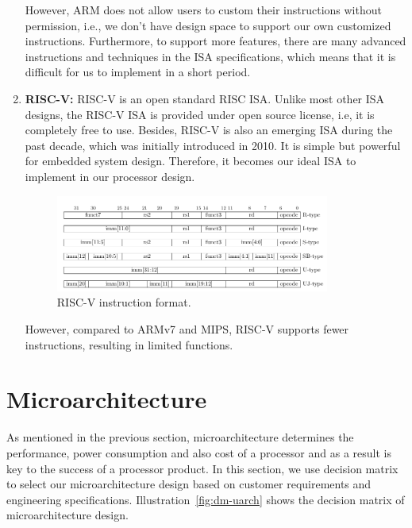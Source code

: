 \begin{enumerate}
However, ARM does not allow users to custom their instructions without permission, i.e., we don't have design space to support our own customized instructions. Furthermore, to support more features, there are many advanced instructions and techniques in the ISA specifications, which means that it is difficult for us to implement in a short period.

\item \textbf{RISC-V:} RISC-V is an open standard RISC ISA. Unlike most other ISA designs, the RISC-V ISA is provided under open source license, i.e, it is completely free to use. Besides, RISC-V is also an emerging ISA during the past decade, which was initially introduced in 2010. It is simple but powerful for embedded system design. Therefore, it becomes our ideal ISA to implement in our processor design.

\begin{figure}[!htp]
    \centering
    \includegraphics[width=0.85\textwidth]{figure/riscv-isa.png}
    \caption{RISC-V instruction format.}
    \label{fig:RISCV_inst}
\end{figure}

However, compared to ARMv7 and MIPS, RISC-V supports fewer instructions, resulting in limited functions.

\end{enumerate}

\section{Microarchitecture} %
As mentioned in the previous section, microarchitecture determines the performance, power consumption and also cost of a processor and as a result is key to the success of a processor product. In this section, we use decision matrix to select our microarchitecture design based on customer requirements and engineering specifications. Illustration~\ref{fig:dm-uarch} shows the decision matrix of microarchitecture design.


